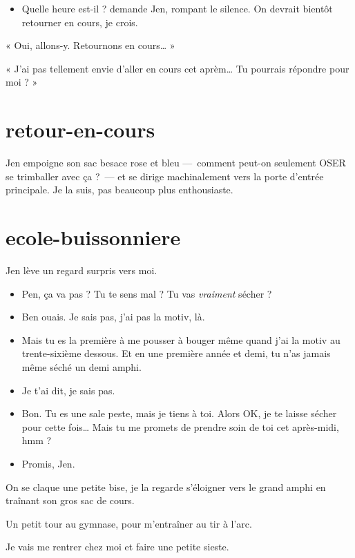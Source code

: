 \begin{itemize}
\item Quelle heure est-il ? demande Jen, rompant le silence. On devrait bientôt retourner en cours, je crois.
\end{itemize}

\item « Oui, allons-y. Retournons en cours… » 
\item « J'ai pas tellement envie d'aller en cours cet aprèm… Tu pourrais répondre pour moi ? » 
\enw

\section{retour-en-cours}

Jen empoigne son sac besace rose et bleu ---~comment peut-on seulement OSER se trimballer avec ça ?~--- et se dirige machinalement vers la porte d'entrée principale. Je la suis, pas beaucoup plus enthousiaste.

\section{ecole-buissonniere}

Jen lève un regard surpris vers moi.

\begin{itemize}
\item Pen, ça va pas ? Tu te sens mal ? Tu vas \textit{vraiment} sécher ?
\item Ben ouais. Je sais pas, j'ai pas la motiv, là.
\item Mais tu es la première à me pousser à bouger même quand j'ai la motiv au trente-sixième dessous. Et en une première année et demi, tu n'as jamais même séché un demi amphi.
\item Je t'ai dit, je sais pas.
\item Bon. Tu es une sale peste, mais je tiens à toi. Alors OK, je te laisse sécher pour cette fois… Mais tu me promets de prendre soin de toi cet après-midi, hmm ?
\item Promis, Jen.
\end{itemize}

On se claque une petite bise, je la regarde s'éloigner vers le grand amphi en traînant son gros sac de cours.

\item Un petit tour au gymnase, pour m'entraîner au tir à l'arc. 
\item Je vais me rentrer chez moi et faire une petite sieste. 
\enw

